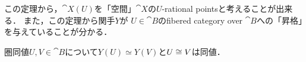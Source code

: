 \documentclass[a4paper, dvipdfmx]{jsarticle}
\begin{document}
\begin{Remark}
    この定理から，$\cat{X}(U)$を「空間」$\cat{X}$の$U$-rational pointsと考えることが出来る．
    また，この定理から関手$Y$が
    $U \in \cat{B}$のfibered category over $\cat{B}$への「昇格」を与えていることが分かる．
\end{Remark}

\begin{Cor}
    圏同値$U, V \in \cat{B}$について$Y(U) \simeq Y(V)$と$U \cong V$は同値．
\end{Cor}



\end{document}
